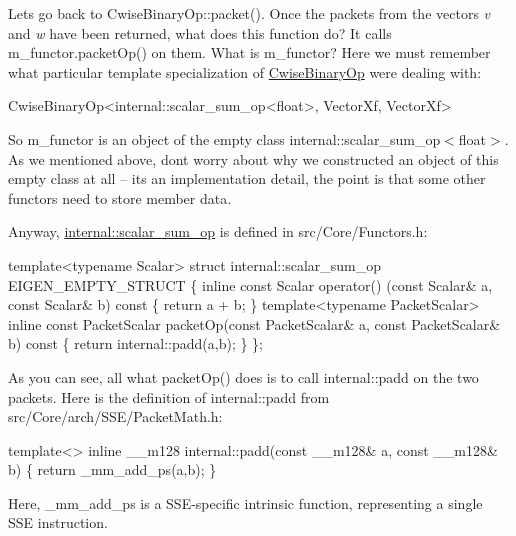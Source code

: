 Let\textquotesingle{}s go back to Cwise\+Binary\+Op\+::packet(). Once the packets from the vectors {\itshape v} and {\itshape w} have been returned, what does this function do? It calls m\+\_\+functor.\+packet\+Op() on them. What is m\+\_\+functor? Here we must remember what particular template specialization of \hyperlink{group___core___module_class_eigen_1_1_cwise_binary_op}{Cwise\+Binary\+Op} we\textquotesingle{}re dealing with\+: 
\begin{DoxyCode}
CwiseBinaryOp<internal::scalar\_sum\_op<float>, VectorXf, VectorXf>
\end{DoxyCode}
 So m\+\_\+functor is an object of the empty class internal\+::scalar\+\_\+sum\+\_\+op$<$float$>$. As we mentioned above, don\textquotesingle{}t worry about why we constructed an object of this empty class at all -- it\textquotesingle{}s an implementation detail, the point is that some other functors need to store member data.

Anyway, \hyperlink{struct_eigen_1_1internal_1_1scalar__sum__op}{internal\+::scalar\+\_\+sum\+\_\+op} is defined in src/\+Core/\+Functors.\+h\+: 
\begin{DoxyCode}
\textcolor{keyword}{template}<\textcolor{keyword}{typename} Scalar> \textcolor{keyword}{struct }internal::scalar\_sum\_op EIGEN\_EMPTY\_STRUCT \{
  \textcolor{keyword}{inline} \textcolor{keyword}{const} Scalar operator() (\textcolor{keyword}{const} Scalar& a, \textcolor{keyword}{const} Scalar& b)\textcolor{keyword}{ const }\{ \textcolor{keywordflow}{return} a + b; \}
  \textcolor{keyword}{template}<\textcolor{keyword}{typename} PacketScalar>
  \textcolor{keyword}{inline} \textcolor{keyword}{const} PacketScalar packetOp(\textcolor{keyword}{const} PacketScalar& a, \textcolor{keyword}{const} PacketScalar& b)\textcolor{keyword}{ const}
\textcolor{keyword}{  }\{ \textcolor{keywordflow}{return} internal::padd(a,b); \}
\};
\end{DoxyCode}
 As you can see, all what packet\+Op() does is to call internal\+::padd on the two packets. Here is the definition of internal\+::padd from src/\+Core/arch/\+S\+S\+E/\+Packet\+Math.\+h\+: 
\begin{DoxyCode}
\textcolor{keyword}{template}<> \textcolor{keyword}{inline} \_\_m128  internal::padd(\textcolor{keyword}{const} \_\_m128&  a, \textcolor{keyword}{const} \_\_m128&  b) \{ \textcolor{keywordflow}{return} \_mm\_add\_ps(a,b); \}
\end{DoxyCode}
 Here, \+\_\+mm\+\_\+add\+\_\+ps is a S\+S\+E-\/specific intrinsic function, representing a single S\+SE instruction.

